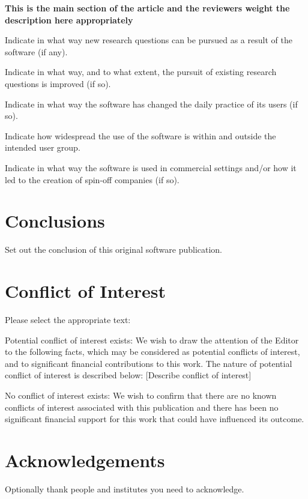 \documentclass[preprint,12pt, a4paper]{elsarticle}
\begin{document}
\textbf{This is the main section of the article and the reviewers weight the description here appropriately}

Indicate in what way new research questions can be pursued as a result of the software (if any).

Indicate in what way, and to what extent, the pursuit of existing research questions is improved (if so).

Indicate in what way the software has changed the daily practice of its users (if so).

Indicate how widespread the use of the software is within and outside the intended user group.

Indicate in what way the software is used in commercial settings and/or how it led to the creation of spin-off companies (if so).

\section{Conclusions}
\label{}

Set out the conclusion of this original software publication.

\section{Conflict of Interest}
Please select the appropriate text:

Potential conflict of interest exists:
We wish to draw the attention of the Editor to the following facts, which may be considered as potential conflicts of interest, and to significant financial contributions to this work. The nature of potential conflict of interest is described below: [Describe conflict of interest]

No conflict of interest exists:
We wish to confirm that there are no known conflicts of interest associated with this publication and there has been no significant financial support for this work that could have influenced its outcome.


\section*{Acknowledgements}

Optionally thank people and institutes you need to acknowledge.

\end{document}
